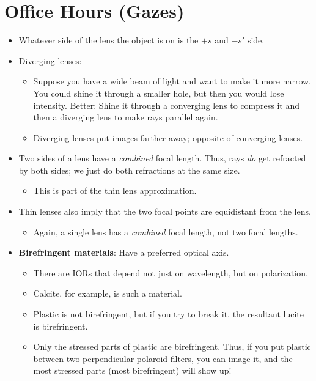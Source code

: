 \documentclass[../notes.tex]{subfiles}
\begin{document}
\section{Office Hours (Gazes)}
\begin{itemize}
    \item Whatever side of the lens the object is on is the $+s$ and $-s'$ side.
    \item Diverging lenses:
    \begin{itemize}
        \item Suppose you have a wide beam of light and want to make it more narrow. You could shine it through a smaller hole, but then you would lose intensity. Better: Shine it through a converging lens to compress it and then a diverging lens to make rays parallel again.
        \item Diverging lenses put images farther away; opposite of converging lenses.
    \end{itemize}
    \item Two sides of a lens have a \emph{combined} focal length. Thus, rays \emph{do} get refracted by both sides; we just do both refractions at the same size.
    \begin{itemize}
        \item This is part of the thin lens approximation.
    \end{itemize}
    \item Thin lenses also imply that the two focal points are equidistant from the lens.
    \begin{itemize}
        \item Again, a single lens has a \emph{combined} focal length, not two focal lengths.
    \end{itemize}
    \item \textbf{Birefringent materials}: Have a preferred optical axis.
    \begin{itemize}
        \item There are IORs that depend not just on wavelength, but on polarization.
        \item Calcite, for example, is such a material.
        \item Plastic is not birefringent, but if you try to break it, the resultant lucite is birefringent.
        \item Only the stressed parts of plastic are birefringent. Thus, if you put plastic between two perpendicular polaroid filters, you can image it, and the most stressed parts (most birefringent) will show up!

\end{itemize}
\end{itemize}
\end{document}
